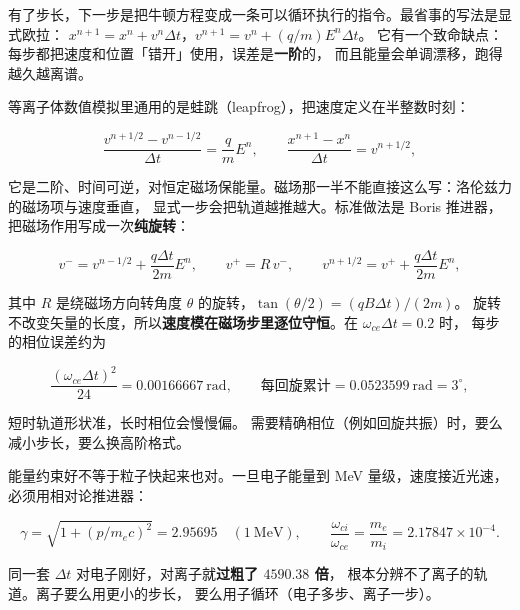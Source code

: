 有了步长，下一步是把牛顿方程变成一条可以循环执行的指令。最省事的写法是显式欧拉：
$x^{n+1}=x^n+v^n\Delta t$，$v^{n+1}=v^n+(q/m)E^n\Delta t$。
它有一个致命缺点：每步都把速度和位置「错开」使用，误差是\textbf{一阶}的，
而且能量会单调漂移，跑得越久越离谱。

等离子体数值模拟里通用的是蛙跳（leapfrog），把速度定义在半整数时刻：

\begin{equation}
\frac{v^{n+1/2}-v^{n-1/2}}{\Delta t}=\frac{q}{m}E^n,
\qquad
\frac{x^{n+1}-x^n}{\Delta t}=v^{n+1/2},
\label{eq:app-ac-leapfrog}
\end{equation}

它是二阶、时间可逆，对恒定磁场保能量。磁场那一半不能直接这么写：洛伦兹力的磁场项与速度垂直，
显式一步会把轨道越推越大。标准做法是 Boris 推进器，把磁场作用写成一次\textbf{纯旋转}：

\begin{equation}
v^{-}=v^{n-1/2}+\frac{q\Delta t}{2m}E^n,
\qquad
v^{+}=R\,v^{-},
\qquad
v^{n+1/2}=v^{+}+\frac{q\Delta t}{2m}E^n,
\label{eq:app-ac-boris}
\end{equation}

其中 $R$ 是绕磁场方向转角度 $\theta$ 的旋转，$\tan(\theta/2)=(qB\Delta t)/(2m)$。
旋转不改变矢量的长度，所以\textbf{速度模在磁场步里逐位守恒}。在 $\omega_{ce}\Delta t=0.2$ 时，
每步的相位误差约为

\begin{equation}
\frac{(\omega_{ce}\Delta t)^2}{24}=0.00166667\ \mathrm{rad},
\qquad
\text{每回旋累计}=0.0523599\ \mathrm{rad}=3^{\circ},
\label{eq:app-ac-phase}
\end{equation}

短时轨道形状准，长时相位会慢慢偏。
需要精确相位（例如回旋共振）时，要么减小步长，要么换高阶格式。

能量约束好不等于粒子快起来也对。一旦电子能量到 MeV 量级，速度接近光速，
必须用相对论推进器：

\begin{equation}
\gamma=\sqrt{1+(p/m_ec)^2}=2.95695\quad(1\ \mathrm{MeV}),
\qquad
\frac{\omega_{ci}}{\omega_{ce}}=\frac{m_e}{m_i}=2.17847\times10^{-4}.
\label{eq:app-ac-relativistic}
\end{equation}

同一套 $\Delta t$ 对电子刚好，对离子就\textbf{过粗了 $4590.38$ 倍}，
根本分辨不了离子的轨道。离子要么用更小的步长，
要么用子循环（电子多步、离子一步）。

